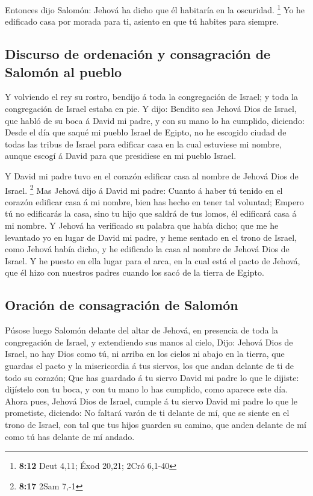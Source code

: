  Entonces dijo Salomón: Jehová ha dicho que él habitaría
en la oscuridad. \footnote{\textbf{8:12} Deut 4,11; Éxod 20,21; 2Cró
  6,1-40}  Yo he edificado casa por morada para ti,
asiento en que tú habites para siempre.

\hypertarget{discurso-de-ordenaciuxf3n-y-consagraciuxf3n-de-salomuxf3n-al-pueblo}{%
\subsection{Discurso de ordenación y consagración de Salomón al
pueblo}\label{discurso-de-ordenaciuxf3n-y-consagraciuxf3n-de-salomuxf3n-al-pueblo}}

 Y volviendo el rey su rostro, bendijo á toda la
congregación de Israel; y toda la congregación de Israel estaba en pie.
 Y dijo: Bendito sea Jehová Dios de Israel, que habló de
su boca á David mi padre, y con su mano lo ha cumplido, diciendo:
 Desde el día que saqué mi pueblo Israel de Egipto, no he
escogido ciudad de todas las tribus de Israel para edificar casa en la
cual estuviese mi nombre, aunque escogí á David para que presidiese en
mi pueblo Israel.

 Y David mi padre tuvo en el corazón edificar casa al
nombre de Jehová Dios de Israel. \footnote{\textbf{8:17} 2Sam 7,-1}
 Mas Jehová dijo á David mi padre: Cuanto á haber tú
tenido en el corazón edificar casa á mi nombre, bien has hecho en tener
tal voluntad;  Empero tú no edificarás la casa, sino tu
hijo que saldrá de tus lomos, él edificará casa á mi nombre.
 Y Jehová ha verificado su palabra que había dicho; que
me he levantado yo en lugar de David mi padre, y heme sentado en el
trono de Israel, como Jehová había dicho, y he edificado la casa al
nombre de Jehová Dios de Israel.  Y he puesto en ella
lugar para el arca, en la cual está el pacto de Jehová, que él hizo con
nuestros padres cuando los sacó de la tierra de Egipto.

\hypertarget{oraciuxf3n-de-consagraciuxf3n-de-salomuxf3n}{%
\subsection{Oración de consagración de
Salomón}\label{oraciuxf3n-de-consagraciuxf3n-de-salomuxf3n}}

 Púsose luego Salomón delante del altar de Jehová, en
presencia de toda la congregación de Israel, y extendiendo sus manos al
cielo,  Dijo: Jehová Dios de Israel, no hay Dios como tú,
ni arriba en los cielos ni abajo en la tierra, que guardas el pacto y la
misericordia á tus siervos, los que andan delante de ti de todo su
corazón;  Que has guardado á tu siervo David mi padre lo
que le dijiste: dijístelo con tu boca, y con tu mano lo has cumplido,
como aparece este día.  Ahora pues, Jehová Dios de
Israel, cumple á tu siervo David mi padre lo que le prometiste,
diciendo: No faltará varón de ti delante de mí, que se siente en el
trono de Israel, con tal que tus hijos guarden su camino, que anden
delante de mí como tú has delante de mí andado.

